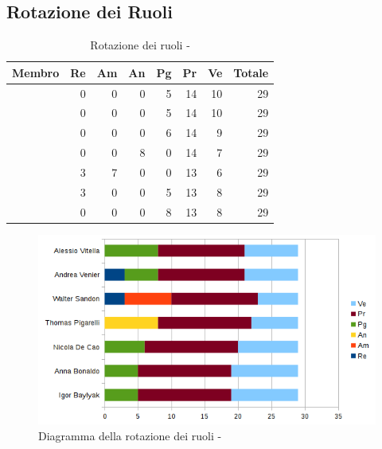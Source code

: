 \documentclass[12pt,a4paper]{article}
\begin{document}
\subsection{Rotazione dei Ruoli}

\begin{table}[h]
	\begin{center}
		\begin{tabular}{l r r r r r r r}
			\toprule
			\textbf{Membro}	&	\textbf{Re}	&	\textbf{Am}	& \textbf{An} & \textbf{Pg} & \textbf{Pr} & \textbf{Ve} & \textbf{Totale}\\
			\midrule
			\midrule
			\IB & 0 & 0 & 0 & 5 & 14 & 10 & 29 \\
			\midrule
			\AB & 0 & 0 & 0 & 5 & 14 & 10 & 29 \\
			\midrule
			\NDC & 0 & 0 & 0 & 6 & 14 & 9 & 29 \\
			\midrule
			\TP & 0 & 0 & 8 & 0 & 14 & 7 & 29 \\
			\midrule
			\WS & 3 & 7 & 0 & 0 & 13 & 6 & 29 \\
			\midrule
			\AVE & 3 & 0 & 0 & 5 & 13 & 8 & 29 \\
			\midrule
			\AVI & 0 & 0 & 0 & 8 & 13 & 8 & 29 \\
			\bottomrule
		\end{tabular}
		\caption{Rotazione dei ruoli - \FPDC}
	\end{center}
\end{table}

\begin{center}
	\begin{figure}[H]
		\centering		\includegraphics[width=\textwidth]{diagrammaBarreProgettazioneDettaglioCodificaRotazioneRuoli.png}
		\caption{Diagramma della rotazione dei ruoli - \FPDC}
	\end{figure}
\end{center}
\end{document}

